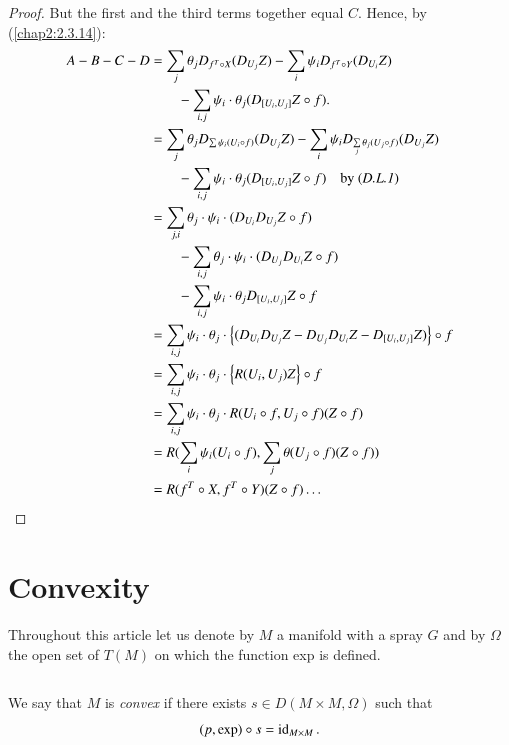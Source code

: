 \begin{proof}
But the first and the third terms together equal $C$. Hence, by
(\ref{chap2:2.3.14}):
\begin{align*}
A-B-C-D &=\sum_{j}\theta_{j}D_{f^{T}\circ
  X}(D_{U_{j}}Z)-\sum_{i}\psi_{i}D_{f^{T}\circ Y}(D_{U_{i}}Z)\\
&\qquad -\sum_{i,j}\psi_{i}\cdot\theta_{j}(D_{[U_{i},U_{j}]}Z\circ
f).\\
&=\sum_{j}\theta_{j}D_{\sum\psi_{i}(U_{i}\circ
  f)}(D_{U_{j}}Z)-\sum_{i}\psi_{i}D_{\sum\limits_{j}\theta_{j}(U_{j}\circ
  f)}(D_{U_{j}}Z)\\
&\qquad -\sum_{i,j}\psi_{i}\cdot\theta_{j}(D_{[U_{i},U_{j}]}Z\circ
f)\quad\text{by ({\em D.L.1})}\\
&=\sum_{j,i}\theta_{j}\cdot \psi_{i}\cdot (D_{U_{i}}D_{U_{j}}Z\circ
f)\\
&\qquad-\sum_{i,j}\theta_{j}\cdot\psi_{i}\cdot (D_{U_{j}}D_{U_{i}}Z\circ
f)\\
&\qquad -\sum_{i,j}\psi_{i}\cdot \theta_{j}D_{[U_{i},U_{j}]}Z\circ f\\
&=\sum_{i,j}\psi_{i}\cdot\theta_{j}\cdot
\left\{(D_{U_{i}}D_{U_{j}}Z-D_{U_{j}}D_{U_{i}}Z-D_{[U_{i},U_{j}]}Z)\right\}\circ
f\\
&= \sum_{i,j}\psi_{i}\cdot \theta_{j}\cdot
\left\{R(U_{i},U_{j})Z\right\}\circ f\\
&= \sum_{i,j}\psi_{i}\cdot \theta_{j}\cdot R(U_{i}\circ f,U_{j}\circ
f)(Z\circ f)\\
&= R(\sum_{i}\psi_{i}(U_{i}\circ f),\sum_{j}\theta(U_{j}\circ
f)(Z\circ f))\\
&= R(f^{T}\circ X,f^{T}\circ Y)(Z\circ f)\ldots
\end{align*}\pageoriginale
\end{proof}

\section{Convexity}\label{chap2:sec6}

Throughout this article let us denote by $M$ a manifold with a spray
$G$ and by $\Omega$ the open set of $T(M)$ on which the function exp
is defined.

\subsection{}\label{chap2:2.6.1}

\begin{defi*}
We say that $M$ is {\em convex} if there exists $s\in D(M\times
M,\Omega)$ such that
$$
(p,\exp)\circ s=\operatorname{id}_{M\times M}.
$$\pageoriginale
\end{defi*}

